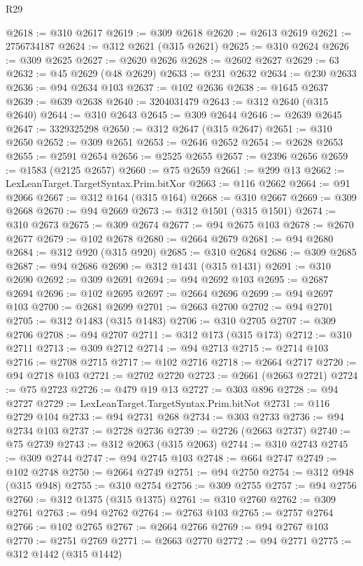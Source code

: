 \begin{lexlean}{R29}
\begin{coremodule}
@2618 := @310 @2617
@2619 := @309 @2618
@2620 := @2613 @2619
@2621 := 2756734187
@2624 := @312 @2621 (@315 @2621)
@2625 := @310 @2624
@2626 := @309 @2625
@2627 := @2620 @2626
@2628 := @2602 @2627
@2629 := 63
@2632 := @45 @2629 (@48 @2629)
@2633 := @231 @2632
@2634 := @230 @2633
@2636 := @94 @2634 @103
@2637 := @102 @2636
@2638 := @1645 @2637
@2639 := @639 @2638
@2640 := 3204031479
@2643 := @312 @2640 (@315 @2640)
@2644 := @310 @2643
@2645 := @309 @2644
@2646 := @2639 @2645
@2647 := 3329325298
@2650 := @312 @2647 (@315 @2647)
@2651 := @310 @2650
@2652 := @309 @2651
@2653 := @2646 @2652
@2654 := @2628 @2653
@2655 := @2591 @2654
@2656 := @2525 @2655
@2657 := @2396 @2656
@2659 := @1583 (@2125 @2657)
@2660 := @75 @2659
@2661 := @299 @13
@2662 := LexLeanTarget.TargetSyntax.Prim.bitXor
@2663 := @116 @2662
@2664 := @91 @2066
@2667 := @312 @164 (@315 @164)
@2668 := @310 @2667
@2669 := @309 @2668
@2670 := @94 @2669
@2673 := @312 @1501 (@315 @1501)
@2674 := @310 @2673
@2675 := @309 @2674
@2677 := @94 @2675 @103
@2678 := @2670 @2677
@2679 := @102 @2678
@2680 := @2664 @2679
@2681 := @94 @2680
@2684 := @312 @920 (@315 @920)
@2685 := @310 @2684
@2686 := @309 @2685
@2687 := @94 @2686
@2690 := @312 @1431 (@315 @1431)
@2691 := @310 @2690
@2692 := @309 @2691
@2694 := @94 @2692 @103
@2695 := @2687 @2694
@2696 := @102 @2695
@2697 := @2664 @2696
@2699 := @94 @2697 @103
@2700 := @2681 @2699
@2701 := @2663 @2700
@2702 := @94 @2701
@2705 := @312 @1483 (@315 @1483)
@2706 := @310 @2705
@2707 := @309 @2706
@2708 := @94 @2707
@2711 := @312 @173 (@315 @173)
@2712 := @310 @2711
@2713 := @309 @2712
@2714 := @94 @2713
@2715 := @2714 @103
@2716 := @2708 @2715
@2717 := @102 @2716
@2718 := @2664 @2717
@2720 := @94 @2718 @103
@2721 := @2702 @2720
@2723 := @2661 (@2663 @2721)
@2724 := @75 @2723
@2726 := @479 @19 @13
@2727 := @303 @896
@2728 := @94 @2727
@2729 := LexLeanTarget.TargetSyntax.Prim.bitNot
@2731 := @116 @2729 @104
@2733 := @94 @2731 @268
@2734 := @303 @2733
@2736 := @94 @2734 @103
@2737 := @2728 @2736
@2739 := @2726 (@2663 @2737)
@2740 := @75 @2739
@2743 := @312 @2063 (@315 @2063)
@2744 := @310 @2743
@2745 := @309 @2744
@2747 := @94 @2745 @103
@2748 := @664 @2747
@2749 := @102 @2748
@2750 := @2664 @2749
@2751 := @94 @2750
@2754 := @312 @948 (@315 @948)
@2755 := @310 @2754
@2756 := @309 @2755
@2757 := @94 @2756
@2760 := @312 @1375 (@315 @1375)
@2761 := @310 @2760
@2762 := @309 @2761
@2763 := @94 @2762
@2764 := @2763 @103
@2765 := @2757 @2764
@2766 := @102 @2765
@2767 := @2664 @2766
@2769 := @94 @2767 @103
@2770 := @2751 @2769
@2771 := @2663 @2770
@2772 := @94 @2771
@2775 := @312 @1442 (@315 @1442)

\end{coremodule}
\end{lexlean}
